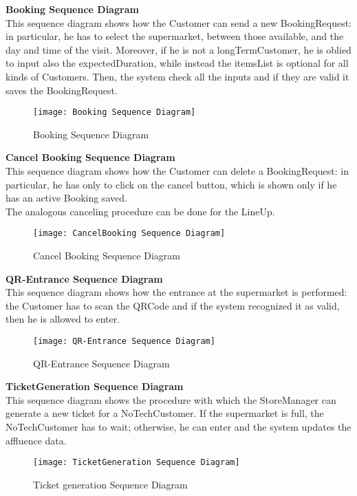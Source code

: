 \textbf{Booking Sequence Diagram} \\
This sequence diagram shows how the Customer can send a new BookingRequest: in particular, he has to select the supermarket, between those available, and the day and time of the visit. Moreover, if he is not a longTermCustomer, he is oblied to input also the expectedDuration, while instead the itemsList is optional for all kinds of Customers. Then, the system check all the inputs and if they are valid it saves the BookingRequest. 
\begin{figure}[H] 
\centerline{\texttt{[image: Booking Sequence Diagram]}}
\caption{Booking Sequence Diagram} 
\end{figure}

\textbf{Cancel Booking Sequence Diagram} \\
This sequence diagram shows how the Customer can delete a BookingRequest: in particular, he has only to click on the cancel button, which is shown only if he has an active Booking saved. \\
The analogous canceling procedure can be done for the LineUp.
\begin{figure}[H] 
\centerline{\texttt{[image: CancelBooking Sequence Diagram]}}
\caption{Cancel Booking Sequence Diagram}
\end{figure}


\textbf{QR-Entrance Sequence Diagram} \\
This sequence diagram shows how the entrance at the supermarket is performed: the Customer has to scan the QRCode and if the system recognized it as valid, then he is allowed to enter.
\begin{figure}[H] 
\centerline{\texttt{[image: QR-Entrance Sequence Diagram]}}
\caption{QR-Entrance Sequence Diagram}
\end{figure}


\textbf{TicketGeneration Sequence Diagram} \\
This sequence diagram shows the procedure with which the StoreManager can generate a new ticket for a NoTechCustomer. If the supermarket is full, the NoTechCustomer has to wait; otherwise, he can enter and the system updates the affluence data.
\begin{figure}[H] 
\centerline{\texttt{[image: TicketGeneration Sequence Diagram]}}
\caption{Ticket generation Sequence Diagram}
\end{figure}